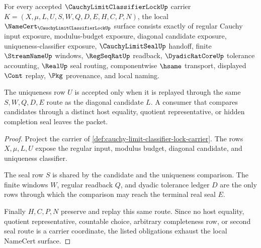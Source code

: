 \begin{theorem}
\label{thm:cauchy-limit-classifier-lock-namecert-obligations}
For every accepted $\CauchyLimitClassifierLockUp$ carrier $K=(X,\mu,L,U,S,W,Q,D,E,H,C,P,N)$, the local $\NameCert_{\CauchyLimitClassifierLockUp}$ surface consists exactly of regular Cauchy input exposure, modulus-budget exposure, diagonal candidate exposure, uniqueness-classifier exposure, $\CauchyLimitSealUp$ handoff, finite $\StreamNameUp$ windows, $\RegSeqRatUp$ readback, $\DyadicRatCoreUp$ tolerance accounting, $\RealUp$ seal routing, componentwise $\hsame$ transport, displayed $\Cont$ replay, $\Pkg$ provenance, and local naming.

The uniqueness row $U$ is accepted only when it is replayed through the same $S,W,Q,D,E$ route as the diagonal candidate $L$. A consumer that compares candidates through a distinct host equality, quotient representative, or hidden completion seal leaves the packet.
\end{theorem}
\begin{proof}
Project the carrier of \autoref{def:cauchy-limit-classifier-lock-carrier}. The rows $X,\mu,L,U$ expose the regular input, modulus budget, diagonal candidate, and uniqueness classifier.

The seal row $S$ is shared by the candidate and the uniqueness comparison. The finite windows $W$, regular readback $Q$, and dyadic tolerance ledger $D$ are the only rows through which the comparison may reach the terminal real seal $E$.

Finally $H,C,P,N$ preserve and replay this same route. Since no host equality, quotient representative, countable choice, arbitrary completeness row, or second seal route is a carrier coordinate, the listed obligations exhaust the local NameCert surface.
\end{proof}


